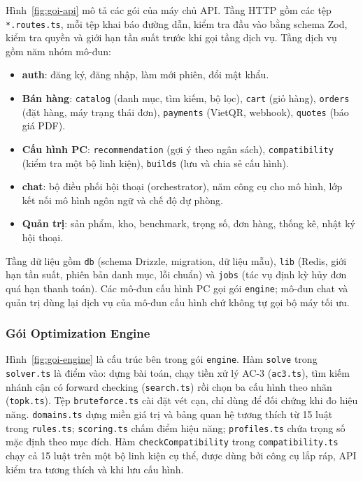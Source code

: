 Hình~\ref{fig:goi-api} mô tả các gói của máy chủ API. Tầng HTTP gồm các tệp \texttt{*.routes.ts}, mỗi tệp khai báo đường dẫn, kiểm tra đầu vào bằng schema Zod, kiểm tra quyền và giới hạn tần suất trước khi gọi tầng dịch vụ. Tầng dịch vụ gồm năm nhóm mô-đun:
\begin{itemize}
  \item \textbf{auth}: đăng ký, đăng nhập, làm mới phiên, đổi mật khẩu.
  \item \textbf{Bán hàng}: \texttt{catalog} (danh mục, tìm kiếm, bộ lọc), \texttt{cart} (giỏ hàng), \texttt{orders} (đặt hàng, máy trạng thái đơn), \texttt{payments} (VietQR, webhook), \texttt{quotes} (báo giá PDF).
  \item \textbf{Cấu hình PC}: \texttt{recommendation} (gợi ý theo ngân sách), \texttt{compatibility} (kiểm tra một bộ linh kiện), \texttt{builds} (lưu và chia sẻ cấu hình).
  \item \textbf{chat}: bộ điều phối hội thoại (orchestrator), năm công cụ cho mô hình, lớp kết nối mô hình ngôn ngữ và chế độ dự phòng.
  \item \textbf{Quản trị}: sản phẩm, kho, benchmark, trọng số, đơn hàng, thống kê, nhật ký hội thoại.
\end{itemize}
Tầng dữ liệu gồm \texttt{db} (schema Drizzle, migration, dữ liệu mẫu), \texttt{lib} (Redis, giới hạn tần suất, phiên bản danh mục, lỗi chuẩn) và \texttt{jobs} (tác vụ định kỳ hủy đơn quá hạn thanh toán). Các mô-đun cấu hình PC gọi gói \texttt{engine}; mô-đun chat và quản trị dùng lại dịch vụ của mô-đun cấu hình chứ không tự gọi bộ máy tối ưu.

\subsubsection{Gói Optimization Engine}


Hình~\ref{fig:goi-engine} là cấu trúc bên trong gói \texttt{engine}. Hàm \texttt{solve} trong \texttt{solver.ts} là điểm vào: dựng bài toán, chạy tiền xử lý AC-3 (\texttt{ac3.ts}), tìm kiếm nhánh cận có forward checking (\texttt{search.ts}) rồi chọn ba cấu hình theo nhãn (\texttt{topk.ts}). Tệp \texttt{bruteforce.ts} cài đặt vét cạn, chỉ dùng để đối chứng khi đo hiệu năng. \texttt{domains.ts} dựng miền giá trị và bảng quan hệ tương thích từ 15 luật trong \texttt{rules.ts}; \texttt{scoring.ts} chấm điểm hiệu năng; \texttt{profiles.ts} chứa trọng số mặc định theo mục đích. Hàm \texttt{checkCompatibility} trong \texttt{compatibility.ts} chạy cả 15 luật trên một bộ linh kiện cụ thể, được dùng bởi công cụ lắp ráp, API kiểm tra tương thích và khi lưu cấu hình.

